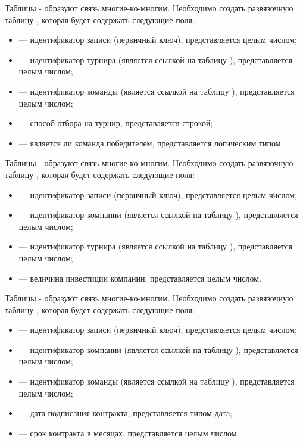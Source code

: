 Таблицы - образуют связь многие-ко-многим. Необходимо создать развязочную таблицу , которая будет содержать следующие поля:
\begin{itemize}
	\item {} --- идентификатор записи (первичный ключ), представляется целым числом;
	\item {} --- идентификатор турнира (является ссылкой на таблицу ), представляется целым числом;
	\item {} --- идентификатор команды (является ссылкой на таблицу ), представляется целым числом;
	\item {} --- способ отбора на турнир, представляется строкой;
	\item {} --- является ли команда победителем, представляется логическим типом.
\end{itemize}

Таблицы - образуют связь многие-ко-многим. Необходимо создать развязочную таблицу , которая будет содержать следующие поля:
\begin{itemize}
	\item {} --- идентификатор записи (первичный ключ), представляется целым числом;
	\item {} --- идентификатор компании (является ссылкой на таблицу ), представляется целым числом;
	\item {} --- идентификатор турнира (является ссылкой на таблицу ), представляется целым числом;
	\item {} --- величина инвестиции компании, представляется целым числом.
\end{itemize}

Таблицы - образуют связь многие-ко-многим. Необходимо создать развязочную таблицу , которая будет содержать следующие поля:
\begin{itemize}
	\item {} --- идентификатор записи (первичный ключ), представляется целым числом;
	\item {} --- идентификатор компании (является ссылкой на таблицу ), представляется целым числом;
	\item {} --- идентификатор команды (является ссылкой на таблицу ), представляется целым числом;
	\item {} --- дата подписания контракта, представляется типом дата;
	\item {} --- срок контракта в месяцах, представляется целым числом.
\end{itemize}


